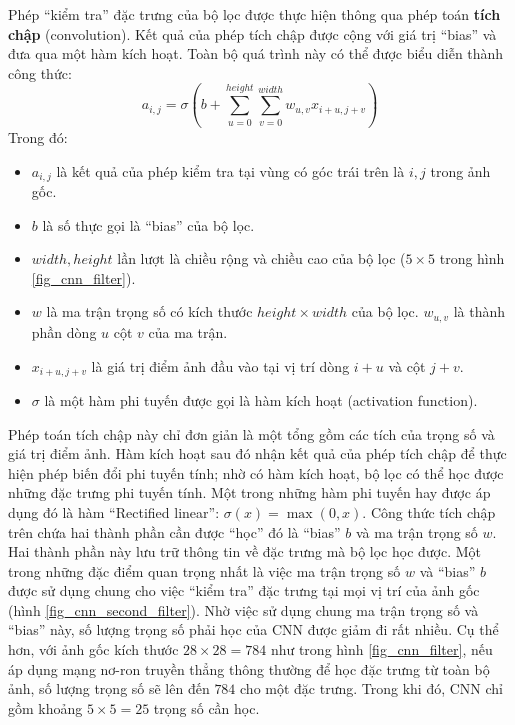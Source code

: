 	Phép ``kiểm tra'' đặc trưng của bộ lọc được thực hiện thông qua phép toán \textbf{tích chập} (convolution).
	Kết quả của phép tích chập được cộng với giá trị ``bias'' và đưa qua một hàm kích hoạt.
	Toàn bộ quá trình này có thể được biểu diễn thành công thức:
	\begin{equation}
		a_{i,j} = \sigma \left( b + \sum_{u = 0}^{height} \sum_{v = 0}^{width} w_{u, v} x_{i + u, j + v} \right)
	\end{equation}
	Trong đó:
	\begin{itemize}
		\item $a_{i,j}$ là kết quả của phép kiểm tra tại vùng có góc trái trên là $i, j$ trong ảnh gốc.
		\item $b$ là số thực gọi là ``bias'' của bộ lọc.
		\item $width, height$ lần lượt là chiều rộng và chiều cao của bộ lọc ($5\times5$ trong hình \ref{fig_cnn_filter}).
		\item $w$ là ma trận trọng số có kích thước $height \times width$ của bộ lọc. 
		$w_{u, v}$ là thành phần dòng $u$ cột $v$ của ma trận.
		\item $x_{i + u, j + v}$ là giá trị điểm ảnh đầu vào tại vị trí dòng $i + u$ và cột $j + v$.
		\item $\sigma$ là một hàm phi tuyến được gọi là hàm kích hoạt (activation function).
	\end{itemize}
	Phép toán tích chập này chỉ đơn giản là một tổng gồm các tích của trọng số và giá trị điểm ảnh.
	Hàm kích hoạt sau đó nhận kết quả của phép tích chập để thực hiện phép biến đổi phi tuyến tính; nhờ có hàm kích hoạt, bộ lọc có thể học được những đặc trưng phi tuyến tính.
	Một trong những hàm phi tuyến hay được áp dụng đó là hàm ``Rectified linear'': $\sigma(x)=\max(0, x)$.
	Công thức tích chập trên chứa hai thành phần cần được ``học'' đó là ``bias'' $b$ và ma trận trọng số $w$.
	Hai thành phần này lưu trữ thông tin về đặc trưng mà bộ lọc học được.
	Một trong những đặc điểm quan trọng nhất là việc ma trận trọng số $w$ và ``bias'' $b$ được sử dụng chung cho việc ``kiểm tra'' đặc trưng tại mọi vị trí của ảnh gốc (hình \ref{fig_cnn_second_filter}).
	Nhờ việc sử dụng chung ma trận trọng số và ``bias'' này, số lượng trọng số phải học của CNN được giảm đi rất nhiều.
	Cụ thể hơn, với ảnh gốc kích thước $28\times28 = 784$ như trong hình \ref{fig_cnn_filter}, nếu áp dụng mạng nơ-ron truyền thẳng thông thường để học đặc trưng từ toàn bộ ảnh, số lượng trọng số sẽ lên đến $784$ cho một đặc trưng.
	Trong khi đó, CNN chỉ gồm khoảng $5\times5=25$ trọng số cần học.
	
